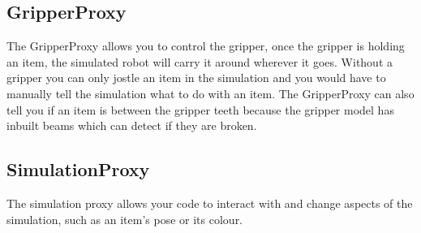 \documentclass[a4paper]{report}
\begin{document}
\subsection{GripperProxy}
The GripperProxy allows you to control the gripper, once the gripper is holding an item, the simulated robot will carry it around wherever it goes. Without a gripper you can only jostle an item in the simulation and you would have to manually tell the simulation what to do with an item. The GripperProxy can also tell you if an item is between the gripper teeth because the gripper model has inbuilt beams which can detect if they are broken. 


\subsection{SimulationProxy}
The simulation proxy allows your code to interact with and change aspects of the simulation, such as an item's pose or its colour. 
\end{document}
